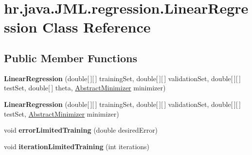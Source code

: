 \hypertarget{classhr_1_1java_1_1_j_m_l_1_1regression_1_1_linear_regression}{\section{hr.\+java.\+J\+M\+L.\+regression.\+Linear\+Regression Class Reference}
\label{classhr_1_1java_1_1_j_m_l_1_1regression_1_1_linear_regression}
}
\subsection*{Public Member Functions}
\begin{DoxyCompactItemize}
\item 
\hypertarget{classhr_1_1java_1_1_j_m_l_1_1regression_1_1_linear_regression_a3a0184c391acc975b4c94a72e9c37935}{{\bfseries Linear\+Regression} (double\mbox{[}$\,$\mbox{]}\mbox{[}$\,$\mbox{]} training\+Set, double\mbox{[}$\,$\mbox{]}\mbox{[}$\,$\mbox{]} validation\+Set, double\mbox{[}$\,$\mbox{]}\mbox{[}$\,$\mbox{]} test\+Set, double\mbox{[}$\,$\mbox{]} theta, \hyperlink{classhr_1_1java_1_1_j_m_l_1_1learning_1_1_abstract_minimizer}{Abstract\+Minimizer} minimizer)}\label{classhr_1_1java_1_1_j_m_l_1_1regression_1_1_linear_regression_a3a0184c391acc975b4c94a72e9c37935}

\item 
\hypertarget{classhr_1_1java_1_1_j_m_l_1_1regression_1_1_linear_regression_a39b44929e6d47ff2c3486cead41f6cd3}{{\bfseries Linear\+Regression} (double\mbox{[}$\,$\mbox{]}\mbox{[}$\,$\mbox{]} training\+Set, double\mbox{[}$\,$\mbox{]}\mbox{[}$\,$\mbox{]} validation\+Set, double\mbox{[}$\,$\mbox{]}\mbox{[}$\,$\mbox{]} test\+Set, \hyperlink{classhr_1_1java_1_1_j_m_l_1_1learning_1_1_abstract_minimizer}{Abstract\+Minimizer} minimizer)}\label{classhr_1_1java_1_1_j_m_l_1_1regression_1_1_linear_regression_a39b44929e6d47ff2c3486cead41f6cd3}

\item 
\hypertarget{classhr_1_1java_1_1_j_m_l_1_1regression_1_1_linear_regression_afd01741d15e9a5f7292b410e34add189}{void {\bfseries error\+Limited\+Training} (double desired\+Error)}\label{classhr_1_1java_1_1_j_m_l_1_1regression_1_1_linear_regression_afd01741d15e9a5f7292b410e34add189}

\item 
\hypertarget{classhr_1_1java_1_1_j_m_l_1_1regression_1_1_linear_regression_a8b9f83ea1e115495377fffad26e95577}{void {\bfseries iteration\+Limited\+Training} (int iterations)}\label{classhr_1_1java_1_1_j_m_l_1_1regression_1_1_linear_regression_a8b9f83ea1e115495377fffad26e95577}


\end{DoxyCompactItemize}
